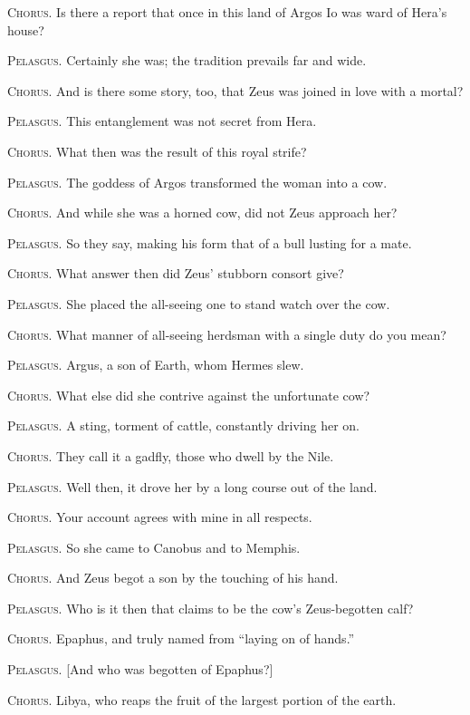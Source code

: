 \documentclass[12pt]{article}
\begin{document}
\textsc{Chorus.} Is there a report that once in this land of Argos Io was ward of Hera's house?

\textsc{Pelasgus.} Certainly she was; the tradition prevails far and wide.

\textsc{Chorus.} And is there some story, too, that Zeus was joined in love with a mortal?

\textsc{Pelasgus.} This entanglement was not secret from Hera.

\textsc{Chorus.} What then was the result of this royal strife?

\textsc{Pelasgus.} The goddess of Argos transformed the woman into a cow.

\textsc{Chorus.} And while she was a horned cow, did not Zeus approach her?

\textsc{Pelasgus.} So they say, making his form that of a bull lusting for a mate.

\textsc{Chorus.} What answer then did Zeus' stubborn consort give?

\textsc{Pelasgus.} She placed the all-seeing one to stand watch over the cow.

\textsc{Chorus.} What manner of all-seeing herdsman with a single duty do you mean?

\textsc{Pelasgus.} Argus, a son of Earth, whom Hermes slew.

\textsc{Chorus.} What else did she contrive against the unfortunate cow?

\textsc{Pelasgus.} A sting, torment of cattle, constantly driving her on.

\textsc{Chorus.} They call it a gadfly, those who dwell by the Nile.

\textsc{Pelasgus.} Well then, it drove her by a long course out of the land.

\textsc{Chorus.} Your account agrees with mine in all respects.

\textsc{Pelasgus.} So she came to Canobus and to Memphis.

\textsc{Chorus.} And Zeus begot a son by the touching of his hand.

\textsc{Pelasgus.} Who is it then that claims to be the cow's Zeus-begotten calf?

\textsc{Chorus.} Epaphus, and truly named from ``laying on of hands.''

\textsc{Pelasgus.} [And who was begotten of Epaphus?]

\textsc{Chorus.} Libya, who reaps the fruit of the largest portion of the earth.
\end{document}
